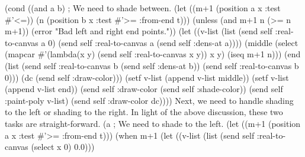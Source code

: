 \nwenddocs{}\plusendmoddef
        (cond
         ((and a b) ; We need to shade between.
          (let ((m+1 (position a x :test #'<=))
                (n (position b x :test #'>= :from-end t)))
            (unless (and m+1 n (>= n m+1))
                 (error "Bad left and right end points."))
            (let ((v-list (list
                           (send self :real-to-canvas a 0)
                           (send self :real-to-canvas a 
                                 (send self :dens-at a))))
                  (middle 
                   (select (mapcar #'(lambda(x y)
                            (send self :real-to-canvas x y)) x y)
                           (iseq m+1 n)))
                  (end (list
                        (send self :real-to-canvas b 
                              (send self :dens-at b))
                        (send self :real-to-canvas b 0)))
                  (dc (send self :draw-color)))
              (setf v-list (append v-list middle))
              (setf v-list (append v-list end))
              (send self :draw-color (send self :shade-color))
              (send self :paint-poly v-list)
              (send self :draw-color dc))))
\nwendcode{}\nwdocspar
Next, we need to handle shading to the left or shading to the
right. In light of the above discussion, these two tasks are
straight-forward. 
\nwenddocs{}\plusendmoddef
         (a ; We need to shade to the left.
          (let ((m+1 (position a x :test #'>= :from-end t)))
            (when m+1
              (let ((v-list 
                     (list 
                       (send self :real-to-canvas (select x 0) 0.0)))
